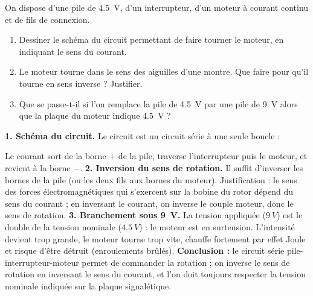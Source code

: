 \documentclass[11pt]{article}
\newcommand{\cle}[1]{{\popxbold\color{popdark}#1}}
\begin{document}
\begin{exoresolu}
On dispose d'une pile de \SI{4,5}{V}, d'un interrupteur, d'un moteur à courant continu et de fils de connexion.
\begin{enumerate}
\item Dessiner le schéma du circuit permettant de faire tourner le moteur, en indiquant le sens du courant.
\item Le moteur tourne dans le sens des aiguilles d'une montre. Que faire pour qu'il tourne en sens inverse ? Justifier.
\item Que se passe-t-il si l'on remplace la pile de \SI{4,5}{V} par une pile de \SI{9}{V} alors que la plaque du moteur indique \SI{4,5}{V} ?
\end{enumerate}
\tcblower
\textbf{1. Schéma du circuit.} Le circuit est un circuit série à une seule boucle :
\begin{center}
\end{center}
Le courant sort de la borne $+$ de la pile, traverse l'interrupteur puis le moteur, et revient à la borne $-$.
\textbf{2. Inversion du sens de rotation.} Il suffit d'\cle{inverser les bornes de la pile} (ou les deux fils aux bornes du moteur). Justification : le sens des forces électromagnétiques qui s'exercent sur la bobine du rotor dépend du sens du courant ; en inversant le courant, on inverse le couple moteur, donc le sens de rotation.
\textbf{3. Branchement sous \SI{9}{V}.} La tension appliquée ($\SI{9}{V}$) est le double de la tension nominale ($\SI{4,5}{V}$) : le moteur est en \cle{surtension}. L'intensité devient trop grande, le moteur tourne trop vite, chauffe fortement par effet Joule et risque d'être \cle{détruit} (enroulements brûlés).
\textbf{Conclusion :} le circuit série pile-interrupteur-moteur permet de commander la rotation ; on inverse le sens de rotation en inversant le sens du courant, et l'on doit toujours respecter la tension nominale indiquée sur la plaque signalétique.
\end{exoresolu}
\end{document}
